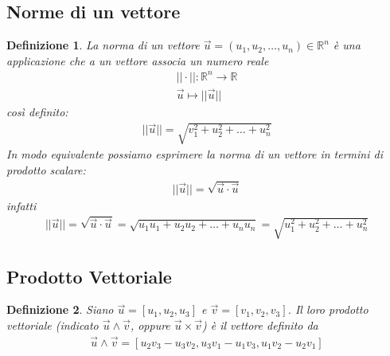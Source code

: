 \documentclass{article}
\newtheorem{defi}{Definizione}[section]
\newtheorem{esempio}{Esempio}[section]
\begin{document}
\subsection{Norme di un vettore}
\label{sec:normVett}
\begin{defi}
  La norma di un vettore $\vec{u}=(u_1,u_2,\dots,u_n)\in \mathds{R}^n$ è una
  applicazione che a un vettore associa un numero reale
  \begin{eqnarray*}
    ||\cdot||: \mathds{R}^n\to \mathds{R}\\
    \vec{u}\mapsto ||\vec{u}||
  \end{eqnarray*}
  così definito:
  \begin{eqnarray*}
    ||\vec{u}||=\sqrt{v_1^2+u_2^2+\dots+u^2_n}
  \end{eqnarray*}
  In modo equivalente possiamo esprimere la norma di un vettore in termini di
  prodotto scalare:
  \begin{eqnarray*}
    ||\vec{u}||=\sqrt{\vec{u}\cdot\vec{u}}
  \end{eqnarray*}
  infatti
  \begin{eqnarray*}
    ||\vec{u}||=\sqrt{\vec{u}\cdot\vec{u}}=\sqrt{u_1u_1+u_2u_2+\dots+u_nu_n}=
    \sqrt{u_1^2+u_2^2+\dots+u_n^2}
  \end{eqnarray*}
\end{defi}
\subsection{Prodotto Vettoriale}
\label{sec:prodVett}

\begin{defi}
  Siano $\vec{u}=[u_1,u_2,u_3]$ e $\vec{v}=[v_1,v_2,v_3]$. Il loro prodotto
  vettoriale (indicato $\vec{u} \wedge \vec{v}$, oppure $\vec{u}\times \vec{v}$)
  è il vettore definito da
  \begin{eqnarray*}
    \vec{u}\wedge \vec{v}=[u_2v_3-u_3v_2,u_3v_1-u_1v_3,u_1v_2-u_2v_1]
  \end{eqnarray*}
\end{defi}
\end{document}
